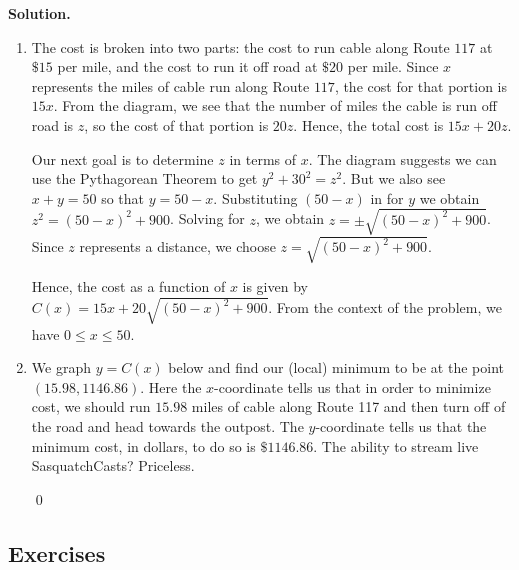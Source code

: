 \documentclass{ximera}
\begin{document}
\begin{example}
\begin{center}
\end{center}





{\bf Solution.}

\begin{enumerate}

\item  The cost is broken into two parts:  the cost to run cable along Route $117$ at $\$15$ per mile, and the cost to run it off road at $\$20$ per mile.  Since $x$ represents the miles of cable run along Route $117$, the cost  for that portion is $15x$.  
From the diagram, we see that the number of miles the cable is run off road is $z$, so the cost of that portion is $20z$.  Hence, the total cost is $15x + 20z$.  

\smallskip

Our next goal is to determine $z$ in terms of $x$.  The diagram suggests we can use the Pythagorean Theorem to get $y^2+30^2 = z^2$.  But we also see $x+y = 50$ so that $y=50-x$.  Substituting $(50-x)$ in for $y$ we obtain $z^2 = (50-x)^2+900$.  Solving for $z$, we obtain $z = \pm \sqrt{(50-x)^2+900}$.  Since $z$ represents a distance, we choose $z = \sqrt{(50-x)^2+900}$.

Hence, the cost as a function of $x$  is given by $C(x) = 15x + 20\sqrt{(50-x)^2+900}$.  From the context of the problem, we have $0 \leq x \leq 50$.


\begin{center}
\end{center}

\item  We graph $y=C(x)$ below and find our (local) minimum to be at the point $(15.98, 1146.86)$.  Here the $x$-coordinate tells us that in order to minimize cost, we should run $15.98$ miles of cable along Route 117 and then turn off of the road and head towards the outpost. The $y$-coordinate tells us that the minimum cost, in dollars, to do so is $\$1146.86$.  The ability to stream live SasquatchCasts?  Priceless.

 \qed

\end{enumerate}

\end{example}

\subsection{Exercises}


\closegraphsfile
\end{document}
